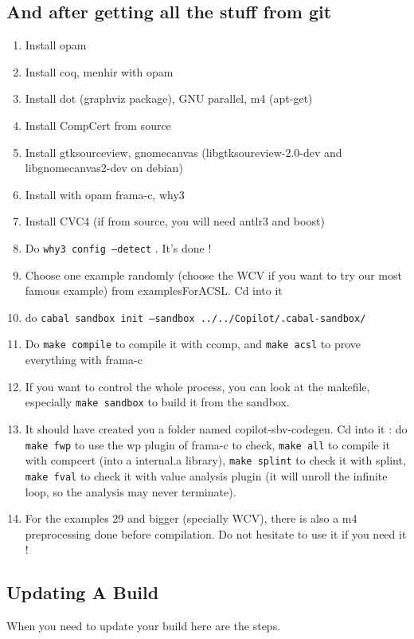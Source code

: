 \subsection{And after getting all the stuff from git}

\begin{enumerate}
	\item Install opam
	\item Install coq, menhir with opam
	\item Install dot (graphviz package), GNU parallel, m4 (apt-get)
	\item Install CompCert from source
	\item Install gtksourceview, gnomecanvas (libgtksoureview-2.0-dev and libgnomecanvas2-dev on debian)
	\item Install with opam frama-c, why3
	\item Install CVC4 (if from source, you will need antlr3 and boost)
	\item Do \texttt{why3 config --detect} . It's done !
	\item Choose one example randomly (choose the WCV if you want to try our most famous example) from examplesForACSL. Cd into it
	\item do \texttt{cabal sandbox init --sandbox ../../Copilot/.cabal-sandbox/}
	\item Do \texttt{make compile} to compile it with ccomp, and \texttt{make acsl} to prove everything with frama-c 
	\item If you want to control the whole process, you can look at the makefile, especially \texttt{make sandbox} to build it from the sandbox.
	\item It should have created you a folder named copilot-sbv-codegen. Cd into it :
	\subitem do \texttt{make fwp} to use the wp plugin of frama-c to check, \texttt{make all} to compile it with compcert (into a internal.a library), \texttt{make splint} to check it with splint, \texttt{make fval} to check it with value analysis plugin (it will unroll the infinite loop, so the analysis may never terminate).
	\item For the examples 29 and bigger (specially WCV), there is also a m4 preprocessing done before compilation. Do not hesitate to use it if you need it !
\end{enumerate}


\subsection{Updating A Build}
When you need to update your build here are the steps.

